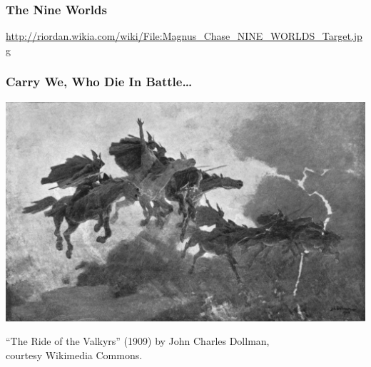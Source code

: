 \begin{frame}[fragile]
\frametitle{The Nine Worlds}
\Large
\url{http://riordan.wikia.com/wiki/File:Magnus_Chase_NINE_WORLDS_Target.jpg}
\end{frame}

\begin{frame}
\frametitle{Carry We, Who Die In Battle\ldots}

\begin{center}
\includegraphics[height=.8\textheight]{images/L10-ride-of-the-valkyrs.jpg}

``The Ride of the Valkyrs'' (1909) by John Charles Dollman, \\
courtesy Wikimedia Commons.
\end{center}
\end{frame}

